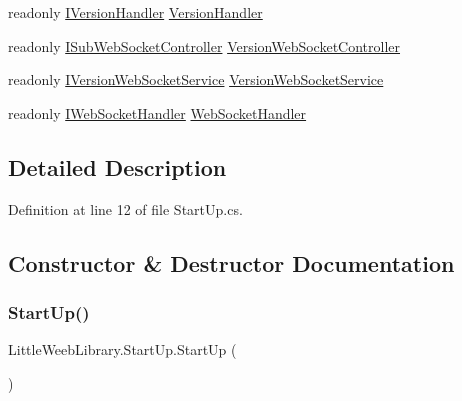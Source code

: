\begin{DoxyCompactItemize}
\item 
readonly \mbox{\hyperlink{interface_little_weeb_library_1_1_handlers_1_1_i_version_handler}{I\+Version\+Handler}} \mbox{\hyperlink{class_little_weeb_library_1_1_start_up_a6d2a07a49ea183721e0c3db070119bc7}{Version\+Handler}}
\item 
readonly \mbox{\hyperlink{interface_little_weeb_library_1_1_controllers_1_1_i_sub_web_socket_controller}{I\+Sub\+Web\+Socket\+Controller}} \mbox{\hyperlink{class_little_weeb_library_1_1_start_up_a7f740efb00da5359c15ecb26a05fd528}{Version\+Web\+Socket\+Controller}}
\item 
readonly \mbox{\hyperlink{interface_little_weeb_library_1_1_services_1_1_i_version_web_socket_service}{I\+Version\+Web\+Socket\+Service}} \mbox{\hyperlink{class_little_weeb_library_1_1_start_up_ae03e11c4c9b89a1592dea78426186a10}{Version\+Web\+Socket\+Service}}
\item 
readonly \mbox{\hyperlink{interface_little_weeb_library_1_1_handlers_1_1_i_web_socket_handler}{I\+Web\+Socket\+Handler}} \mbox{\hyperlink{class_little_weeb_library_1_1_start_up_a2da461ac41945c5a63d4561a513dcaef}{Web\+Socket\+Handler}}
\end{DoxyCompactItemize}


\subsection{Detailed Description}


Definition at line 12 of file Start\+Up.\+cs.



\subsection{Constructor \& Destructor Documentation}
\mbox{\label{class_little_weeb_library_1_1_start_up_a7f35b9dfb45fb003a9653d1f531044c9}} 
\subsubsection{\texorpdfstring{Start\+Up()}{StartUp()}}
{\footnotesize\ttfamily Little\+Weeb\+Library.\+Start\+Up.\+Start\+Up (\begin{DoxyParamCaption}{ }\end{DoxyParamCaption})}



